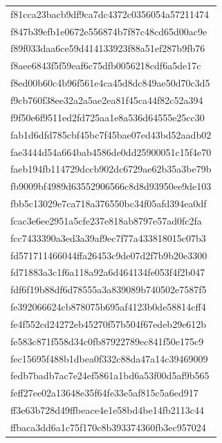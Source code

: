 \begin{tabular}{l}
f81cca23bacb9df9ca7dc4372c0356054a57211474 \\
f847b39efb1e0672e556874b7f87c48cd65d00ac9e \\
f89f033daa6ce59d414133923f88a51ef287b9fb76 \\
f8aee6843f5f59eaf6c75dfb0056218cdf6a5de17c \\
f8ed00b60c4b96f561e4ca45d8dc849ae50d70c3d5 \\
f9cb760f38ee32a2a5ae2ea81f45ca44f82c52a394 \\
f9f50e6f9511ed2fd725aa1e8a536d64555e25cc30 \\
fab1d6dfd785cbf45bc7f45bae07ed43bd52aadb02 \\
fae3444d54a664bab4586de0dd25900051c15f4e70 \\
faeb194fb114729dccb902dc6729ae62b35a3be79b \\
fb9009bf4989d63552906566c8d8d93950ee9de103 \\
fbb5c13029e7ca718a376550bc34f05afd394ea0df \\
fcac3e6ee2951a5cfe237e818ab8797e57ad0fc2fa \\
fcc7433390a3ed3a39af9ec7f77a433818015c07b3 \\
fd571711466044ffa26453c9de07d2f7b9b20e3300 \\
fd71883a3c1f6a118a92a6d464134fe053f4f2b047 \\
fdf6f19b88df6d78555a3a839089b740502e7587f5 \\
fe392066624cb878075b695af4123b0de58814cff4 \\
fe4f552cd24272eb45270f57b504f67edeb29e612b \\
fe583c871f558d34c0fb87922789ec841f50e175c9 \\
fec15695f488b1dbea0f332c88da47a14c39469009 \\
fedb7badb7ac7e24ef5861a1bd6a53f00d5af9b565 \\
feff27ee02a13648e35f64fe33e5af815c5a6ed917 \\
ff3e63b728d49ffbeace4e1e58bd4be14fb2113c44 \\
ffbaca3dd6a1c75f170c8b393374360fb3ec957024 \\
\bottomrule
\end{tabular}
